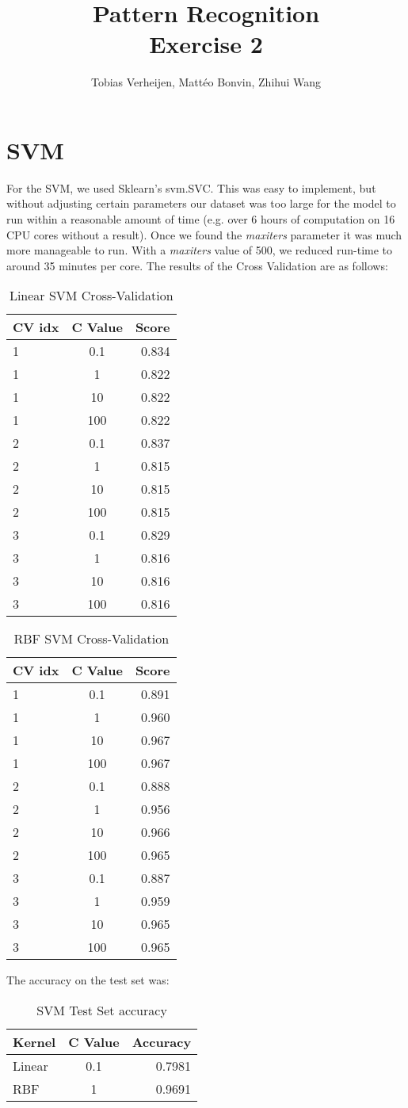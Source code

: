 \documentclass{article}
\title{Pattern Recognition \\\Large{Exercise 2}}
\author{Tobias Verheijen, Mattéo Bonvin, Zhihui Wang}
\date{}
\begin{document}
\maketitle

\section{SVM}
For the SVM, we used Sklearn's svm.SVC. This was easy to implement, but without adjusting certain parameters our dataset was too large for the model to run within a reasonable amount of time (e.g. over 6 hours of computation on 16 CPU cores without a result). Once we found the \textit{maxiters} parameter it was much more manageable to run. With a \textit{maxiters} value of 500, we reduced run-time to around 35 minutes per core.
The results of the Cross Validation are as follows:

\begin{table}[H]
\centering
\begin{tabular}{l|c|r}
CV idx & C Value & Score \\\hline
1 & 0.1 & 0.834 \\
1 & 1 & 0.822 \\
1 & 10 & 0.822 \\
1 & 100 & 0.822 \\
2 & 0.1 & 0.837 \\
2 & 1 & 0.815 \\
2 & 10 & 0.815 \\
2 & 100 & 0.815 \\
3 & 0.1 & 0.829 \\
3 & 1 & 0.816 \\
3 & 10 & 0.816 \\
3 & 100 & 0.816 \\
\end{tabular}
\caption{Linear SVM Cross-Validation}
\end{table}

\begin{table}[H]
\centering
\begin{tabular}{l|c|r}
CV idx & C Value & Score \\\hline
1 & 0.1 & 0.891 \\
1 & 1 & 0.960 \\
1 & 10 & 0.967 \\
1 & 100 & 0.967 \\
2 & 0.1 & 0.888 \\
2 & 1 & 0.956 \\
2 & 10 & 0.966 \\
2 & 100 & 0.965 \\
3 & 0.1 & 0.887 \\
3 & 1 & 0.959 \\
3 & 10 & 0.965 \\
3 & 100 & 0.965 \\
\end{tabular}
\caption{RBF SVM Cross-Validation}
\end{table}

The accuracy on the test set was:
\begin{table}[H]
\centering
\begin{tabular}{l|c|r}
Kernel & C Value & Accuracy \\\hline
Linear & 0.1 & 0.7981 \\
RBF & 1 & 0.9691 \\
\end{tabular}
\caption{SVM Test Set accuracy}
\end{table}
\end{document}
